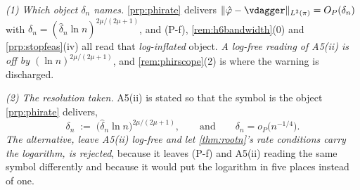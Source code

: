 \begin{remark}\label{rem:rootnlog}
\emph{(1) Which object $\delta_n$ names.} \cref{prp:phirate} delivers
$\|\hat\varphi-\vdagger\|_{L^{2}(\pi)}=O_P(\delta_n)$ with
$\delta_n=(\hat\delta_n\ln n)^{2\mu/(2\mu+1)}$, and (P-f), \cref{rem:h6bandwidth}\textup{(0)} and
\cref{prp:stopfeas}\textup{(iv)} all read that \emph{log-inflated} object. \emph{A log-free reading of
A5(ii) is off by $(\ln n)^{2\mu/(2\mu+1)}$}, and \cref{rem:phirscope}\textup{(2)} is where the warning
is discharged.

\emph{(2) The resolution taken.} A5(ii) is stated so that the symbol is the object
\cref{prp:phirate} delivers,
\begin{equation}\label{eq:deltalog}
\delta_n\;:=\;\big(\hat\delta_n\ln n\big)^{2\mu/(2\mu+1)},
\qquad\text{and}\qquad \delta_n=o_P\big(n^{-1/4}\big) .
\end{equation}
\emph{The alternative, leave A5(ii) log-free and let \cref{thm:rootn}'s rate conditions carry
the logarithm, is rejected}, because it leaves (P-f) and A5(ii) reading the same symbol
differently and because it would put the logarithm in five places instead of one.


\end{remark}
